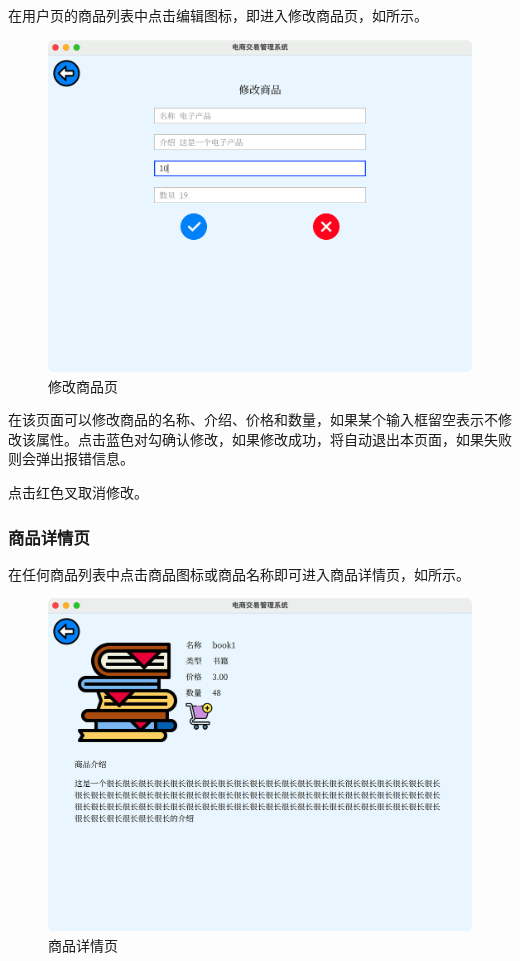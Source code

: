 \documentclass[lang=cn,11pt,a4paper,cite=authornum]{paper}
\begin{document}
在用户页的商品列表中点击编辑图标，即进入修改商品页，如所示。

\begin{figure}[htbp]
    \centering
    \includegraphics[width=0.7\linewidth]{./Images/editcom.png}
    \caption{修改商品页\label{fig:editcom}}
\end{figure}

在该页面可以修改商品的名称、介绍、价格和数量，如果某个输入框留空表示不修改该属性。点击蓝色对勾确认修改，如果修改成功，将自动退出本页面，如果失败则会弹出报错信息。

点击红色叉取消修改。

\subsubsection{商品详情页}

在任何商品列表中点击商品图标或商品名称即可进入商品详情页，如所示。

\begin{figure}[htbp]
    \centering
    \includegraphics[width=0.7\linewidth]{./Images/comdetail.png}
    \caption{商品详情页\label{fig:comdetail}}
\end{figure}
\end{document}
